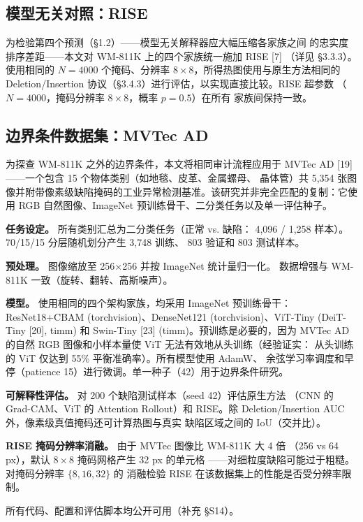 \documentclass[11pt,a4paper]{article}
\begin{document}
\subsection{模型无关对照：RISE}

为检验第四个预测（§1.2）——模型无关解释器应大幅压缩各家族之间 的忠实度排序差距——本文对 WM-811K 上的四个家族统一施加 RISE [7] （详见 §3.3.3）。使用相同的 $N{=}4000$ 个掩码、分辨率 $8{\times}8$，所得热图使用与原生方法相同的 Deletion/Insertion 协议（§3.4.3）进行评估，以实现直接比较。RISE 超参数 （$N{=}4000$，掩码分辨率 $8{\times}8$，概率 $p{=}0.5$）在所有 家族间保持一致。

\subsection{边界条件数据集：MVTec AD}

为探查 WM-811K 之外的边界条件，本文将相同审计流程应用于 MVTec AD [19]——一个包含 15 个物体类别（如地毯、皮革、金属螺母、 晶体管）共 5,354 张图像并附带像素级缺陷掩码的工业异常检测基准。该研究并非完全匹配的复制：它使用 RGB 自然图像、ImageNet 预训练骨干、二分类任务以及单一评估种子。

\textbf{任务设定。} 所有类别汇总为二分类任务（正常 vs. 缺陷： 4,096 / 1,258 样本）。70/15/15 分层随机划分产生 3,748 训练、 803 验证和 803 测试样本。

\textbf{预处理。} 图像缩放至 256×256 并按 ImageNet 统计量归一化。 数据增强与 WM-811K 一致（旋转、翻转、高斯噪声）。

\textbf{模型。} 使用相同的四个架构家族，均采用 ImageNet 预训练骨干：ResNet18+CBAM (torchvision)、DenseNet121 (torchvision)、ViT-Tiny (DeiT-Tiny [20], timm) 和 Swin-Tiny [23] (timm)。预训练是必要的，因为 MVTec AD 的自然 RGB 图像和小样本量使 ViT 无法有效地从头训练（经验证实： 从头训练的 ViT 仅达到 55\% 平衡准确率）。所有模型使用 AdamW、 余弦学习率调度和早停（patience 15）进行微调。单一种子（42）用于边界条件研究。

\textbf{可解释性评估。} 对 200 个缺陷测试样本（seed 42）评估原生方法 （CNN 的 Grad-CAM、ViT 的 Attention Rollout）和 RISE。除 Deletion/Insertion AUC 外，像素级真值掩码还可计算热图与真实 缺陷区域之间的 IoU（交并比）。

\textbf{RISE 掩码分辨率消融。} 由于 MVTec 图像比 WM-811K 大 4 倍 （256 vs 64 px），默认 $8{\times}8$ 掩码网格产生 32 px 的单元格 ——对细粒度缺陷可能过于粗糙。对掩码分辨率 $\{8, 16, 32\}$ 的 消融检验 RISE 在该数据集上的性能是否受分辨率限制。

所有代码、配置和评估脚本均公开可用（补充 §S14）。
\end{document}
